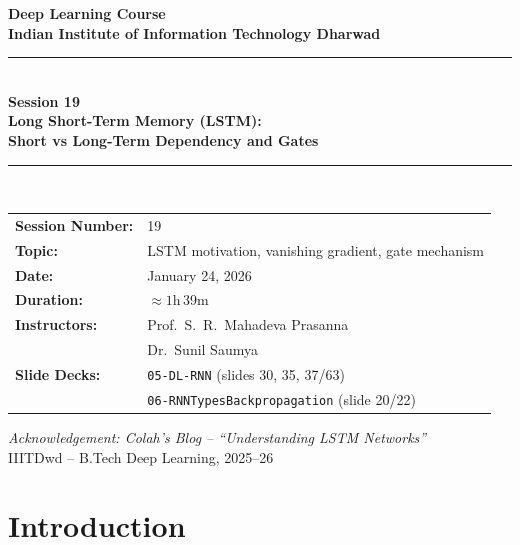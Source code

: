 \documentclass[12pt,a4paper]{article}
\begin{document}
\begin{titlepage}
  \centering
  \vspace*{2cm}
  {\LARGE\bfseries Deep Learning Course\\[0.4em]
   Indian Institute of Information Technology Dharwad\\[1.5em]}
  \rule{\linewidth}{1pt}\\[0.8em]
  {\huge\bfseries Session 19\\[0.5em]
   Long Short-Term Memory (LSTM):\\[0.3em]
   Short vs Long-Term Dependency and Gates}\\[0.8em]
  \rule{\linewidth}{1pt}\\[1.5em]
  \begin{tabular}{ll}
    \textbf{Session Number:} & 19 \\[0.4em]
    \textbf{Topic:}          & LSTM motivation, vanishing gradient, gate mechanism \\[0.4em]
    \textbf{Date:}           & January 24, 2026 \\[0.4em]
    \textbf{Duration:}       & $\approx 1$h\,39m \\[0.4em]
    \textbf{Instructors:}    & Prof.\ S.\ R.\ Mahadeva Prasanna \\
                             & Dr.\ Sunil Saumya \\[0.4em]
    \textbf{Slide Decks:}    & \texttt{05-DL-RNN} (slides 30, 35, 37/63) \\
                             & \texttt{06-RNNTypesBackpropagation} (slide 20/22) \\
  \end{tabular}
  \vfill
  {\large\itshape Acknowledgement: Colah's Blog --
   ``Understanding LSTM Networks''}\\[1em]
  {\large IIITDwd -- B.Tech Deep Learning, 2025--26}
\end{titlepage}


\newpage

\section{Introduction}
\label{sec:introduction}
\end{document}
